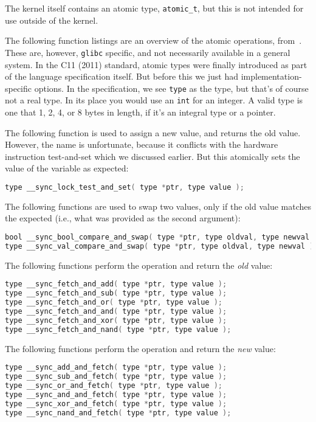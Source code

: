 The kernel itself contains an atomic type, \texttt{atomic\_t}, but this is not intended for use outside of the kernel.

The following function listings are an overview of the atomic operations, from~\cite{gccatomic}. These are, however, \texttt{glibc} specific, and not necessarily available in a general system. In the C11 (2011) standard, atomic types were finally introduced as part of the language specification itself. But before this we just had implementation-specific options. In the specification, we see \texttt{type} as the type, but that's of course not a real type. In its place you would use an \texttt{int} for an integer. A valid type is one that 1, 2, 4, or 8 bytes in length, if it's an integral type or a pointer.

The following function is used to assign a new value, and returns the old value. However, the name is unfortunate, because it conflicts with the hardware instruction test-and-set which we discussed earlier. But this atomically sets the value of the variable as expected:

\begin{lstlisting}[language=C]
type __sync_lock_test_and_set( type *ptr, type value );
\end{lstlisting}


The following functions are used to swap two values, only if the old value matches the expected (i.e., what was provided as the second argument):

\begin{lstlisting}[language=C]
bool __sync_bool_compare_and_swap( type *ptr, type oldval, type newval );
type __sync_val_compare_and_swap( type *ptr, type oldval, type newval );
\end{lstlisting}


The following functions perform the operation and return the \textit{old} value:
\begin{lstlisting}[language=C]
type __sync_fetch_and_add( type *ptr, type value );
type __sync_fetch_and_sub( type *ptr, type value );
type __sync_fetch_and_or( type *ptr, type value );
type __sync_fetch_and_and( type *ptr, type value );
type __sync_fetch_and_xor( type *ptr, type value );
type __sync_fetch_and_nand( type *ptr, type value );
\end{lstlisting}

The following functions perform the operation and return the \textit{new} value:
\begin{lstlisting}[language=C]
type __sync_add_and_fetch( type *ptr, type value );
type __sync_sub_and_fetch( type *ptr, type value );
type __sync_or_and_fetch( type *ptr, type value );
type __sync_and_and_fetch( type *ptr, type value );
type __sync_xor_and_fetch( type *ptr, type value );
type __sync_nand_and_fetch( type *ptr, type value );
\end{lstlisting}



